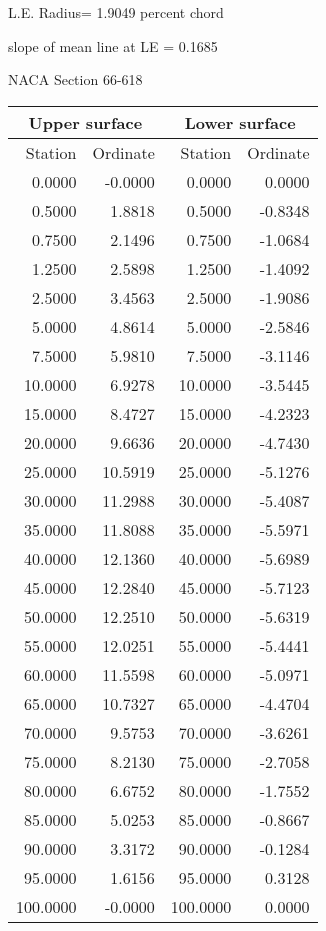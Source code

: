 \documentclass[11pt]{book}
\begin{document}
L.E. Radius=  1.9049 percent chord


 slope of mean line at LE =  0.1685
 \newpage
  \label{s66-618}
 \begin{Large}
 NACA Section 66-618
 \end{Large}
  
 \vspace{8mm}
 \begin{tabular}{|r|r|r|r|} \hline 
 \multicolumn{2}{|c|}{Upper surface} & \multicolumn{2}{|c|}{Lower surface} \\
 \hline
 Station & Ordinate & Station & Ordinate \\
 \hline
0.0000 & -0.0000 & 0.0000 & 0.0000 \\
0.5000 & 1.8818 & 0.5000 & -0.8348 \\
0.7500 & 2.1496 & 0.7500 & -1.0684 \\
1.2500 & 2.5898 & 1.2500 & -1.4092 \\
2.5000 & 3.4563 & 2.5000 & -1.9086 \\
5.0000 & 4.8614 & 5.0000 & -2.5846 \\
7.5000 & 5.9810 & 7.5000 & -3.1146 \\
10.0000 & 6.9278 & 10.0000 & -3.5445 \\
15.0000 & 8.4727 & 15.0000 & -4.2323 \\
20.0000 & 9.6636 & 20.0000 & -4.7430 \\
25.0000 & 10.5919 & 25.0000 & -5.1276 \\
30.0000 & 11.2988 & 30.0000 & -5.4087 \\
35.0000 & 11.8088 & 35.0000 & -5.5971 \\
40.0000 & 12.1360 & 40.0000 & -5.6989 \\
45.0000 & 12.2840 & 45.0000 & -5.7123 \\
50.0000 & 12.2510 & 50.0000 & -5.6319 \\
55.0000 & 12.0251 & 55.0000 & -5.4441 \\
60.0000 & 11.5598 & 60.0000 & -5.0971 \\
65.0000 & 10.7327 & 65.0000 & -4.4704 \\
70.0000 & 9.5753 & 70.0000 & -3.6261 \\
75.0000 & 8.2130 & 75.0000 & -2.7058 \\
80.0000 & 6.6752 & 80.0000 & -1.7552 \\
85.0000 & 5.0253 & 85.0000 & -0.8667 \\
90.0000 & 3.3172 & 90.0000 & -0.1284 \\
95.0000 & 1.6156 & 95.0000 & 0.3128 \\
100.0000 & -0.0000 & 100.0000 & 0.0000 \\
 \hline 
 \end{tabular}
\end{document}
